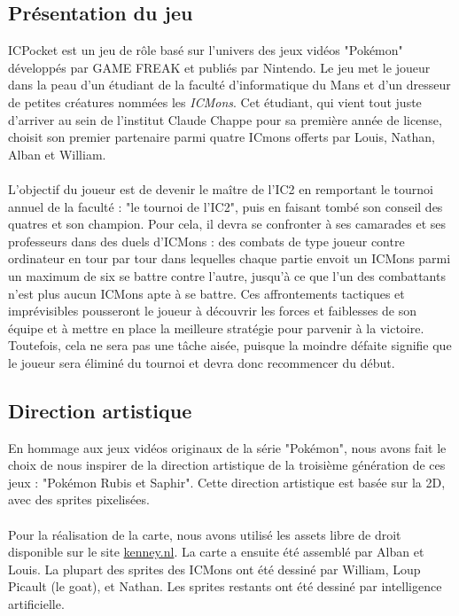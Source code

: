 \documentclass[12pt,a4paper, twoside]{article}
\begin{document}
    \subsection{Présentation du jeu}
        ICPocket est un jeu de rôle basé sur l'univers des jeux vidéos "Pokémon" développés par GAME FREAK et publiés par Nintendo.
        Le jeu met le joueur dans la peau d'un étudiant de la faculté d'informatique du Mans et d'un dresseur de petites créatures nommées les \emph{ICMons}.
        Cet étudiant, qui vient tout juste d'arriver au sein de l'institut Claude Chappe pour sa première année de license, choisit son premier partenaire parmi quatre ICmons offerts par Louis, Nathan, Alban et William.
        \paragraph{}L'objectif du joueur est de devenir le maître de l'IC2 en remportant le tournoi annuel de la faculté : "le tournoi de l'IC2", puis en faisant tombé son conseil des quatres et son champion. Pour cela, il devra se confronter à ses camarades et ses professeurs dans des duels d'ICMons : 
        des combats de type joueur contre ordinateur en tour par tour dans lequelles chaque partie envoit un ICMons parmi un maximum de six se battre contre l'autre, jusqu'à ce que l'un des combattants n'est plus aucun ICMons apte à se battre.
        Ces affrontements tactiques et imprévisibles pousseront le joueur à découvrir les forces et faiblesses de son équipe et à mettre en place la meilleure stratégie pour parvenir à la victoire.
        Toutefois, cela ne sera pas une tâche aisée, puisque la moindre défaite signifie que le joueur sera éliminé du tournoi et devra donc recommencer du début.

    \subsection{Direction artistique}
        En hommage aux jeux vidéos originaux de la série "Pokémon", nous avons fait le choix de nous inspirer de la direction artistique de la troisième génération de ces jeux : "Pokémon Rubis et Saphir".
        Cette direction artistique est basée sur la 2D, avec des sprites pixelisées. \paragraph{} Pour la réalisation de la carte, nous avons utilisé les assets libre de droit disponible sur le site \href{https://kenney.nl/assets}{kenney.nl}. La carte a ensuite été assemblé par Alban et Louis. La plupart des sprites des ICMons ont été dessiné par William, Loup Picault (le goat), et Nathan. Les sprites restants ont été dessiné par intelligence artificielle.
\end{document}
